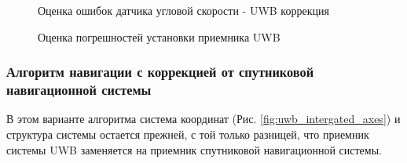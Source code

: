 \documentclass[14pt]{article}
\begin{document}
\begin{figure}
\noindent{}
\caption{Оценка ошибок датчика угловой скорости - UWB коррекция}
\label{fig:uwb_gyro_bias}
\end{figure}

\begin{figure}
\noindent{}
\caption{Оценка погрешностей установки приемника UWB}
\label{fig:uwb_lever}
\end{figure}

\clearpage

\subsubsection{Алгоритм навигации с коррекцией от спутниковой навигационной системы}
В этом варианте алгоритма система координат (Рис. \ref{fig:uwb_intergated_axes}) и структура системы остается прежней, с той только разницей, что приемник системы UWB заменяется на приемник  спутниковой навигационной системы.
\end{document}
